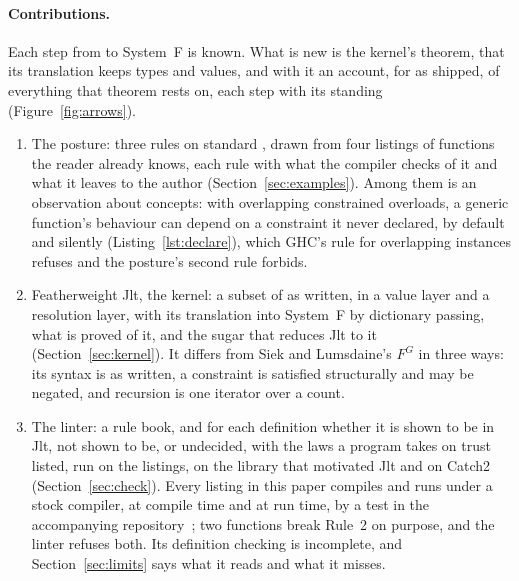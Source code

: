 \paragraph{Contributions.}
Each step from  to System~F is known.
What is new is the kernel's theorem, that its translation keeps types and values, and with it an account, for \Cpp{} as shipped, of everything that theorem rests on, each step with its standing (Figure~\ref{fig:arrows}).
\begin{enumerate}
\item The posture: three rules on standard , drawn from four listings of functions the reader already knows, each rule with what the compiler checks of it and what it leaves to the author (Section~\ref{sec:examples}).
Among them is an observation about  concepts: with overlapping constrained overloads, a generic function's behaviour can depend on a constraint it never declared, by default and silently (Listing~\ref{lst:declare}), which GHC's rule for overlapping instances refuses and the posture's second rule forbids.
\item Featherweight Jlt, the kernel: a subset of  as written, in a value layer and a resolution layer, with its translation into System~F by dictionary passing, what is proved of it, and the sugar that reduces Jlt to it (Section~\ref{sec:kernel}).
It differs from Siek and Lumsdaine's $F^G$ in three ways: its syntax is  as written, a constraint is satisfied structurally and may be negated, and recursion is one iterator over a count.
\item The linter: a rule book, and for each definition whether it is shown to be in Jlt, not shown to be, or undecided, with the laws a program takes on trust listed, run on the listings, on the library that motivated Jlt and on Catch2 (Section~\ref{sec:check}).
Every \Cpp{} listing in this paper compiles and runs under a stock compiler, at compile time and at run time, by a test in the accompanying repository~\cite{Krautler_dedekind_2026}; two functions break Rule~2 on purpose, and the linter refuses both.
Its definition checking is incomplete, and Section~\ref{sec:limits} says what it reads and what it misses.
\end{enumerate}

